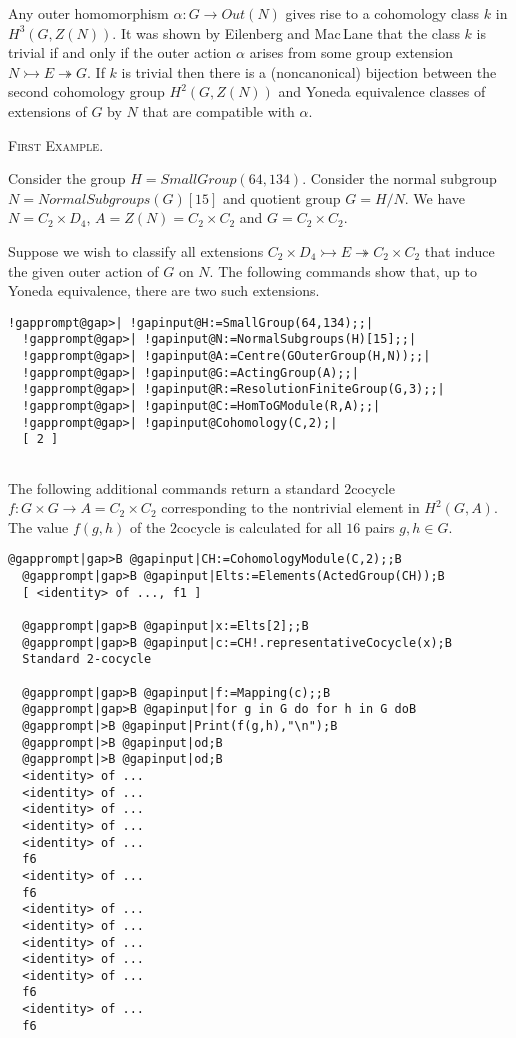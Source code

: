 \documentclass[a4paper,11pt]{report}
\begin{document}
{{Any outer homomorphism $\alpha\colon G\rightarrow Out(N)$ gives rise to a cohomology class $k$ in $H^3(G,Z(N))$. It was shown by Eilenberg and Mac$\,$Lane that the class $k$ is trivial if and only if the outer action $\alpha$ arises from some group extension $N\rightarrowtail E\twoheadrightarrow G$. If $k$ is trivial then there is a (non\texttt{}canonical) bijection
between the second cohomology group $H^2(G,Z(N))$ and Yoneda equivalence classes of extensions of $G$ by $N$ that are compatible with $\alpha$. 

\textsc{First Example.} 

 Consider the group $H=SmallGroup(64,134)$. Consider the normal subgroup $N=NormalSubgroups(G)[15]$ and quotient group $G=H/N$. We have $N=C_2\times D_4$, $A=Z(N)=C_2\times C_2$ and $G=C_2\times C_2$. 

 Suppose we wish to classify all extensions $C_2\times D_4 \rightarrowtail E \twoheadrightarrow C_2\times C_2$ that induce the given outer action of $G$ on $N$. The following commands show that, up to Yoneda equivalence, there are two
such extensions. 
\begin{Verbatim}[commandchars=!@|,fontsize=\small,frame=single,label=Example]
  !gapprompt@gap>| !gapinput@H:=SmallGroup(64,134);;|
  !gapprompt@gap>| !gapinput@N:=NormalSubgroups(H)[15];;|
  !gapprompt@gap>| !gapinput@A:=Centre(GOuterGroup(H,N));;|
  !gapprompt@gap>| !gapinput@G:=ActingGroup(A);;|
  !gapprompt@gap>| !gapinput@R:=ResolutionFiniteGroup(G,3);;|
  !gapprompt@gap>| !gapinput@C:=HomToGModule(R,A);;|
  !gapprompt@gap>| !gapinput@Cohomology(C,2);|
  [ 2 ]
  
\end{Verbatim}
 

The following additional commands return a standard $2$\texttt{}cocycle $f:G\times G\rightarrow A =C_2\times C_2$ corresponding to the non\texttt{}trivial element in $H^2(G,A)$. The value $f(g,h)$ of the $2$\texttt{}cocycle is calculated for all $16$ pairs $g,h \in G$. 
\begin{Verbatim}[commandchars=@|B,fontsize=\small,frame=single,label=Example]
  @gapprompt|gap>B @gapinput|CH:=CohomologyModule(C,2);;B
  @gapprompt|gap>B @gapinput|Elts:=Elements(ActedGroup(CH));B
  [ <identity> of ..., f1 ]
  
  @gapprompt|gap>B @gapinput|x:=Elts[2];;B
  @gapprompt|gap>B @gapinput|c:=CH!.representativeCocycle(x);B
  Standard 2-cocycle 
  
  @gapprompt|gap>B @gapinput|f:=Mapping(c);;B
  @gapprompt|gap>B @gapinput|for g in G do for h in G doB
  @gapprompt|>B @gapinput|Print(f(g,h),"\n");B
  @gapprompt|>B @gapinput|od;B
  @gapprompt|>B @gapinput|od;B
  <identity> of ...
  <identity> of ...
  <identity> of ...
  <identity> of ...
  <identity> of ...
  f6
  <identity> of ...
  f6
  <identity> of ...
  <identity> of ...
  <identity> of ...
  <identity> of ...
  <identity> of ...
  f6
  <identity> of ...
  f6
  

\end{Verbatim}}}
\end{document}
